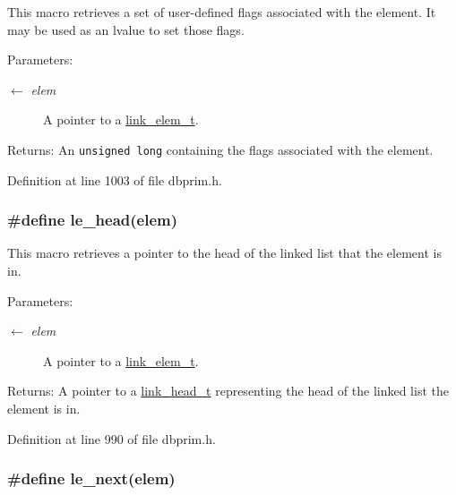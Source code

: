 This macro retrieves a set of user-defined flags associated with the element. It may be used as an lvalue to set those flags.

\begin{Desc}
\item[Parameters:]
\begin{description}
\item[\mbox{$\leftarrow$} {\em elem}]A pointer to a \hyperlink{group__dbprim__link_ga1}{link\_\-elem\_\-t}.\end{description}
\end{Desc}
\begin{Desc}
\item[Returns:]An {\tt unsigned long} containing the flags associated with the element.\end{Desc}


Definition at line 1003 of file dbprim.h.\hypertarget{group__dbprim__link_ga26}{
\subsubsection[le\_\-head]{\setlength{\rightskip}{0pt plus 5cm}\#define le\_\-head(elem)}}
\label{group__dbprim__link_ga26}


This macro retrieves a pointer to the head of the linked list that the element is in.

\begin{Desc}
\item[Parameters:]
\begin{description}
\item[\mbox{$\leftarrow$} {\em elem}]A pointer to a \hyperlink{group__dbprim__link_ga1}{link\_\-elem\_\-t}.\end{description}
\end{Desc}
\begin{Desc}
\item[Returns:]A pointer to a \hyperlink{group__dbprim__link_ga0}{link\_\-head\_\-t} representing the head of the linked list the element is in.\end{Desc}


Definition at line 990 of file dbprim.h.\hypertarget{group__dbprim__link_ga23}{
\subsubsection[le\_\-next]{\setlength{\rightskip}{0pt plus 5cm}\#define le\_\-next(elem)}}
\label{group__dbprim__link_ga23}


